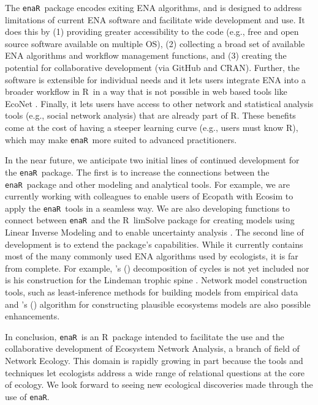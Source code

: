 \documentclass[11pt]{article}
\def\citeapos#1{\citeauthor{#1}'s (\citeyear{#1})}
\newcommand{\R}{R}
\newcommand{\enaR}{\texttt{enaR}}
\begin{document}
\begin{spacing}{2}
The \enaR\ package encodes exiting ENA algorithms, and is designed to
address limitations of current ENA software and facilitate wide
development and use. It does this by (1) providing greater
accessibility to the code (e.g., free and open source software
available on multiple OS), (2) collecting a broad set of available ENA
algorithms and workflow management functions, and (3) creating the
potential for collaborative development (via GitHub and CRAN).
Further, the software is extensible for individual needs and it lets
users integrate ENA into a broader workflow in \R\ in a way that is
not possible in web based tools like EcoNet
\citep{kazanci07,schramski11}.  Finally, it lets users have access to
other network and statistical analysis tools (e.g., social network
analysis) that are already part of \R.  These benefits come at the
cost of having a steeper learning curve (e.g., users must know \R ),
which may make \enaR\ more suited to advanced practitioners.

In the near future, we anticipate two initial lines of continued
development for the \enaR\ package. The first is to increase the
connections between the \enaR\ package and other modeling and
analytical tools.  For example, we are currently working with
colleagues to enable users of Ecopath with Ecosim
\citep{christensen04} to apply the \enaR\ tools in a seamless way.  We
are also developing functions to connect between \enaR\ and the \R\
limSolve package \citep{soetaert09} for creating models using Linear
Inverse Modeling and to enable uncertainty analysis
\citep{kones09}. The second line of development is to extend the
package's capabilities.  While it currently contains most of the many
commonly used ENA algorithms used by ecologists, it is far from
complete. For example, \citeapos{ulanowicz83} decomposition of cycles
is not yet included nor is his construction for the Lindeman trophic
spine \citep{ulanowicz1979trophic}. Network model construction
tools, such as least-inference methods for building models from
empirical data \citep{ulanowicz2008least} and \citeapos{fath04_cyber}
algorithm for constructing plausible ecosystems models are also
possible enhancements.

In conclusion, \enaR\ is an \R\ package intended to facilitate the use
and the collaborative development of Ecosystem Network Analysis, a
branch of field of Network Ecology.  This domain is rapidly growing in part
because the tools and techniques let ecologists address a wide range
of relational questions at the core of ecology.  We look forward to
seeing new ecological discoveries made through the use of \enaR.




\end{spacing}
\end{document}
